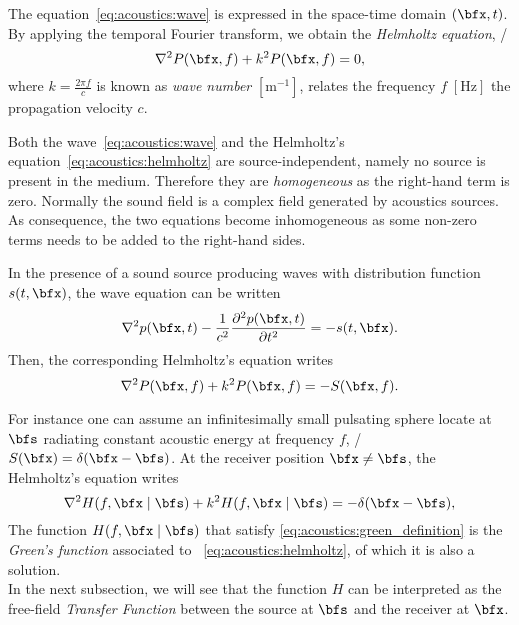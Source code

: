 The equation~\ref{eq:acoustics:wave} is expressed in the space-time domain $\depSpaceTime$.
By applying the temporal Fourier transform, we obtain the \textit{Helmholtz equation}, \ie/
\begin{equation}
    \label{eq:acoustics:helmholtz}
    \knabla^2 P(\positionMicrophone, f) + k^2 P(\positionMicrophone, f) = 0
    ,
\end{equation}
where $k = \frac{2 \pi f}{c}$  is known as \textit{wave number} $[\si{\metre^{-1}}]$,  relates the frequency $f \; [\si{\hertz}]$  the propagation velocity $c$.

Both the wave~\ref{eq:acoustics:wave} and the Helmholtz's equation~\ref{eq:acoustics:helmholtz} are source-independent,
namely no source is present in the medium.
Therefore they are  \textit{homogeneous} as the right-hand term is zero.
Normally the sound field is a complex field generated by acoustics sources.
As consequence, the two equations become inhomogeneous as some non-zero terms needs to be added to the right-hand sides.

In the presence of a sound source producing waves with distribution function $s(t, \positionMicrophone)$, the wave equation can be written
\begin{equation}
    \label{eq:acoustics:source}
    \knabla^2 \pressureSpaceTime - \frac{1}{\speedOfSound^2} \kpderiv[2]{\pressureSpaceTime}{t} = -s(t, \positionMicrophone)
    .
\end{equation}
Then, the corresponding Helmholtz's equation writes
\begin{equation}
    \label{eq:acoustics:source_freq}
    \knabla^2 P(\positionMicrophone, f) + k^2 P(\positionMicrophone, f) = - S(\positionMicrophone, f)
    .
\end{equation}

For instance one can assume an infinitesimally small pulsating sphere locate at $\positionSource$ radiating constant acoustic energy at frequency $f$,
\ie/ $S(\positionMicrophone) = \delta(\positionMicrophone - \positionSource)$.
At the receiver position $\positionMicrophone \neq \positionSource$, the Helmholtz's equation writes
\begin{equation}
    \label{eq:acoustics:green_definition}
    \knabla^2 H(f, \positionMicrophone \mid \positionSource)
     + k^2 H(f, \positionMicrophone \mid \positionSource) = - \delta(\positionMicrophone - \positionSource)
    ,
\end{equation}
The function $H(f, \positionMicrophone \mid \positionSource)$ that satisfy \cref{eq:acoustics:green_definition} is  the \textit{Green's function} 
associated to ~\cref{eq:acoustics:helmholtz}, of which it is also a solution.
\\In the next subsection, we will see that the function $H$ can be interpreted as the free-field \textit{Transfer Function}
between the source at $\positionSource$ and the receiver at $\positionMicrophone$.

